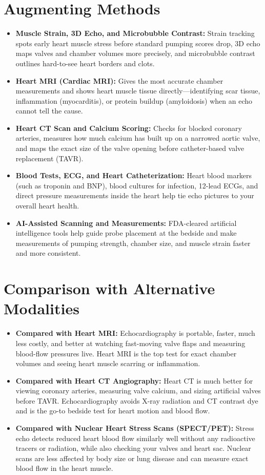 \section{Augmenting Methods}
\begin{itemize}
\item \textbf{Muscle Strain, 3D Echo, and Microbubble Contrast:} Strain tracking spots early heart muscle stress before standard pumping scores drop, 3D echo maps valves and chamber volumes more precisely, and microbubble contrast outlines hard-to-see heart borders and clots.
\item \textbf{Heart MRI (Cardiac MRI):} Gives the most accurate chamber measurements and shows heart muscle tissue directly---identifying scar tissue, inflammation (myocarditis), or protein buildup (amyloidosis) when an echo cannot tell the cause.
\item \textbf{Heart CT Scan and Calcium Scoring:} Checks for blocked coronary arteries, measures how much calcium has built up on a narrowed aortic valve, and maps the exact size of the valve opening before catheter-based valve replacement (TAVR).
\item \textbf{Blood Tests, ECG, and Heart Catheterization:} Heart blood markers (such as troponin and BNP), blood cultures for infection, 12-lead ECGs, and direct pressure measurements inside the heart help tie echo pictures to your overall heart health.
\item \textbf{AI-Assisted Scanning and Measurements:} FDA-cleared artificial intelligence tools help guide probe placement at the bedside and make measurements of pumping strength, chamber size, and muscle strain faster and more consistent.
\end{itemize}


\section{Comparison with Alternative Modalities}
\begin{itemize}
\item \textbf{Compared with Heart MRI:} Echocardiography is portable, faster, much less costly, and better at watching fast-moving valve flaps and measuring blood-flow pressures live. Heart MRI is the top test for exact chamber volumes and seeing heart muscle scarring or inflammation.
\item \textbf{Compared with Heart CT Angiography:} Heart CT is much better for viewing coronary arteries, measuring valve calcium, and sizing artificial valves before TAVR. Echocardiography avoids X-ray radiation and CT contrast dye and is the go-to bedside test for heart motion and blood flow.
\item \textbf{Compared with Nuclear Heart Stress Scans (SPECT/PET):} Stress echo detects reduced heart blood flow similarly well without any radioactive tracers or radiation, while also checking your valves and heart sac. Nuclear scans are less affected by body size or lung disease and can measure exact blood flow in the heart muscle.
\end{itemize}



